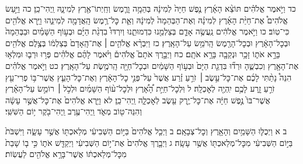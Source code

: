 \documentclass[twoside, openany, parskip=half, 11pt]{book}
\begin{document}
כד וַיֹּ֣אמֶר אֱלֹהִ֗ים תּוֹצֵ֨א הָאָ֜רֶץ נֶ֤פֶשׁ חַיָּה֙ לְמִינָ֔הּ בְּהֵמָ֥ה וָרֶ֛מֶשׂ וְחַֽיְתוֹ־אֶ֖רֶץ לְמִינָ֑הּ וַֽיְהִי־כֵֽן׃ כה וַיַּ֣עַשׂ אֱלֹהִים֩ אֶת־חַיַּ֨ת הָאָ֜רֶץ לְמִינָ֗הּ וְאֶת־הַבְּהֵמָה֙ לְמִינָ֔הּ וְאֵ֛ת כׇּל־רֶ֥מֶשׂ הָֽאֲדָמָ֖ה לְמִינֵ֑הוּ וַיַּ֥רְא אֱלֹהִ֖ים כִּי־טֽוֹב׃ כו וַיֹּ֣אמֶר אֱלֹהִ֔ים נַֽעֲשֶׂ֥ה אָדָ֛ם בְּצַלְמֵ֖נוּ כִּדְמוּתֵ֑נוּ וְיִרְדּוּ֩ בִדְגַ֨ת הַיָּ֜ם וּבְע֣וֹף הַשָּׁמַ֗יִם וּבַבְּהֵמָה֙ וּבְכׇל־הָאָ֔רֶץ וּבְכׇל־הָרֶ֖מֶשׂ הָֽרֹמֵ֥שׂ עַל־הָאָֽרֶץ׃ כז וַיִּבְרָ֨א אֱלֹהִ֤ים ׀ אֶת־הָֽאָדָם֙ בְּצַלְמ֔וֹ בְּצֶ֥לֶם אֱלֹהִ֖ים בָּרָ֣א אֹת֑וֹ זָכָ֥ר וּנְקֵבָ֖ה בָּרָ֥א אֹתָֽם׃ כח וַיְבָ֣רֶךְ אֹתָם֮ אֱלֹהִים֒ וַיֹּ֨אמֶר לָהֶ֜ם אֱלֹהִ֗ים פְּר֥וּ וּרְב֛וּ וּמִלְא֥וּ אֶת־הָאָ֖רֶץ וְכִבְשֻׁ֑הָ וּרְד֞וּ בִּדְגַ֤ת הַיָּם֙ וּבְע֣וֹף הַשָּׁמַ֔יִם וּבְכׇל־חַיָּ֖ה הָֽרֹמֶ֥שֶׂת עַל־הָאָֽרֶץ׃ כט וַיֹּ֣אמֶר אֱלֹהִ֗ים הִנֵּה֩ נָתַ֨תִּי לָכֶ֜ם אֶת־כׇּל־עֵ֣שֶׂב ׀ זֹרֵ֣עַ זֶ֗רַע אֲשֶׁר֙ עַל־פְּנֵ֣י כׇל־הָאָ֔רֶץ וְאֶת־כׇּל־הָעֵ֛ץ אֲשֶׁר־בּ֥וֹ פְרִי־עֵ֖ץ זֹרֵ֣עַ זָ֑רַע לָכֶ֥ם יִֽהְיֶ֖ה לְאׇכְלָֽה׃ ל וּֽלְכׇל־חַיַּ֣ת הָ֠אָ֠רֶץ וּלְכׇל־ע֨וֹף הַשָּׁמַ֜יִם וּלְכֹ֣ל ׀ רוֹמֵ֣שׂ עַל־הָאָ֗רֶץ אֲשֶׁר־בּוֹ֙ נֶ֣פֶשׁ חַיָּ֔ה אֶת־כׇּל־יֶ֥רֶק עֵ֖שֶׂב לְאׇכְלָ֑ה וַֽיְהִי־כֵֽן׃ לא וַיַּ֤רְא אֱלֹהִים֙ אֶת־כׇּל־אֲשֶׁ֣ר עָשָׂ֔ה וְהִנֵּה־ט֖וֹב מְאֹ֑ד וַֽיְהִי־עֶ֥רֶב וַֽיְהִי־בֹ֖קֶר י֥וֹם הַשִּׁשִּֽׁי׃

ב א וַיְכֻלּ֛וּ הַשָּׁמַ֥יִם וְהָאָ֖רֶץ וְכׇל־צְבָאָֽם׃ ב וַיְכַ֤ל אֱלֹהִים֙ בַּיּ֣וֹם הַשְּׁבִיעִ֔י מְלַאכְתּ֖וֹ אֲשֶׁ֣ר עָשָׂ֑ה וַיִּשְׁבֹּת֙ בַּיּ֣וֹם הַשְּׁבִיעִ֔י מִכׇּל־מְלַאכְתּ֖וֹ אֲשֶׁ֥ר עָשָֽׂה׃ ג וַיְבָ֤רֶךְ אֱלֹהִים֙ אֶת־י֣וֹם הַשְּׁבִיעִ֔י וַיְקַדֵּ֖שׁ אֹת֑וֹ כִּ֣י ב֤וֹ שָׁבַת֙ מִכׇּל־מְלַאכְתּ֔וֹ אֲשֶׁר־בָּרָ֥א אֱלֹהִ֖ים לַעֲשֽׂוֹת׃
\end{document}
